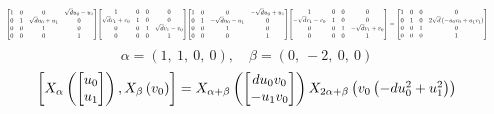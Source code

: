 \documentclass[11pt]{article}
\theoremstyle{definition}
\begin{document}
\[
\scaletoalign{\textwidth}{{\left[\begin{matrix}1 & 0 & 0 & \sqrt{d} u_{0} - u_{1}\\0 & 1 & \sqrt{d} u_{0} + u_{1} & 0\\0 & 0 & 1 & 0\\0 & 0 & 0 & 1\end{matrix}\right]} {\left[\begin{matrix}1 & 0 & 0 & 0\\\sqrt{d} v_{1} + v_{0} & 1 & 0 & 0\\0 & 0 & 1 & \sqrt{d} v_{1} - v_{0}\\0 & 0 & 0 & 1\end{matrix}\right]} {\left[\begin{matrix}1 & 0 & 0 & - \sqrt{d} u_{0} + u_{1}\\0 & 1 & - \sqrt{d} u_{0} - u_{1} & 0\\0 & 0 & 1 & 0\\0 & 0 & 0 & 1\end{matrix}\right]} {\left[\begin{matrix}1 & 0 & 0 & 0\\- \sqrt{d} v_{1} - v_{0} & 1 & 0 & 0\\0 & 0 & 1 & - \sqrt{d} v_{1} + v_{0}\\0 & 0 & 0 & 1\end{matrix}\right]} = {\left[\begin{matrix}1 & 0 & 0 & 0\\0 & 1 & 0 & 2 \sqrt{d} \left(- u_{0} v_{0} + u_{1} v_{1}\right)\\0 & 0 & 1 & 0\\0 & 0 & 0 & 1\end{matrix}\right]}}
\]
\[
\alpha = \left( 1, \  1, \  0, \  0\right), \quad \beta = \left( 0, \  -2, \  0, \  0\right)
\]
\[
\scaletoalign{\textwidth}{\left[ X_{\alpha}\left(\left[\begin{matrix}u_{0}\\u_{1}\end{matrix}\right]\right), X_{\beta}\left(v_{0}\right) \right] = X_{\alpha + \beta}\left(\left[\begin{matrix}d u_{0} v_{0}\\- u_{1} v_{0}\end{matrix}\right]\right) X_{2\alpha + \beta}\left(v_{0} \left(- d u_{0}^{2} + u_{1}^{2}\right)\right)}
\]
\end{document}
